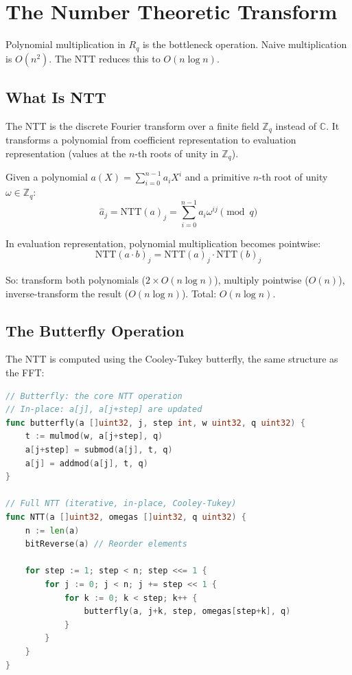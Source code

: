\section{The Number Theoretic Transform}


Polynomial multiplication in $R_q$ is the bottleneck operation. Naive multiplication
is $O(n^2)$. The NTT reduces this to $O(n \log n)$.

\subsection{What Is NTT}

The NTT is the discrete Fourier transform over a finite field $\mathbb{Z}_q$ instead of
$\mathbb{C}$. It transforms a polynomial from coefficient representation to evaluation
representation (values at the $n$-th roots of unity in $\mathbb{Z}_q$).

\begin{definition}[NTT]
Given a polynomial $a(X) = \sum_{i=0}^{n-1} a_i X^i$ and a primitive $n$-th root of
unity $\omega \in \mathbb{Z}_q$:
\[
\hat{a}_j = \text{NTT}(a)_j = \sum_{i=0}^{n-1} a_i \omega^{ij} \pmod{q}
\]
\end{definition}

In evaluation representation, polynomial multiplication becomes pointwise:
\[
\text{NTT}(a \cdot b)_j = \text{NTT}(a)_j \cdot \text{NTT}(b)_j
\]

So: transform both polynomials ($2 \times O(n \log n)$), multiply pointwise ($O(n)$),
inverse-transform the result ($O(n \log n)$). Total: $O(n \log n)$.

\subsection{The Butterfly Operation}

The NTT is computed using the Cooley-Tukey butterfly, the same structure as the FFT:

\begin{lstlisting}[language=Go,caption={NTT butterfly operation in Go}]
// Butterfly: the core NTT operation
// In-place: a[j], a[j+step] are updated
func butterfly(a []uint32, j, step int, w uint32, q uint32) {
    t := mulmod(w, a[j+step], q)
    a[j+step] = submod(a[j], t, q)
    a[j] = addmod(a[j], t, q)
}

// Full NTT (iterative, in-place, Cooley-Tukey)
func NTT(a []uint32, omegas []uint32, q uint32) {
    n := len(a)
    bitReverse(a) // Reorder elements

    for step := 1; step < n; step <<= 1 {
        for j := 0; j < n; j += step << 1 {
            for k := 0; k < step; k++ {
                butterfly(a, j+k, step, omegas[step+k], q)
            }
        }
    }
}
\end{lstlisting}

